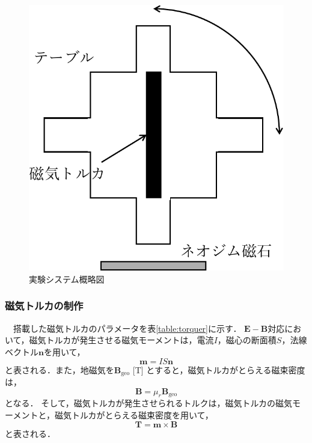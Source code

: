 \begin{figure}[H]
	\centering
		\includegraphics[scale=0.5]{./figure/system-crop.pdf}
		\caption{実験システム概略図}
		\label{fig:systemfig}
\end{figure}

\subsubsection{磁気トルカの制作}

　搭載した磁気トルカのパラメータを表\ref{table:torquer}に示す．
$\boldsymbol{E-B}$対応において，磁気トルカが発生させる磁気モーメントは，電流$I$，磁心の断面積$S$，法線ベクトル$\boldsymbol{n}$を用いて，
\begin{equation}
	\boldsymbol{m}=IS\boldsymbol{n}
\end{equation}
と表される．また，地磁気を$\boldsymbol{B}_\mathrm{geo}$ [T] とすると，磁気トルカがとらえる磁束密度は，
\begin{equation}
	\boldsymbol{B} = \mu_r\boldsymbol{B}_\mathrm{geo}
\end{equation}
となる．
そして，磁気トルカが発生させられるトルクは，磁気トルカの磁気モーメントと，磁気トルカがとらえる磁束密度を用いて，
\begin{equation}
	\boldsymbol{T = m \times B}
\end{equation}
と表される．

